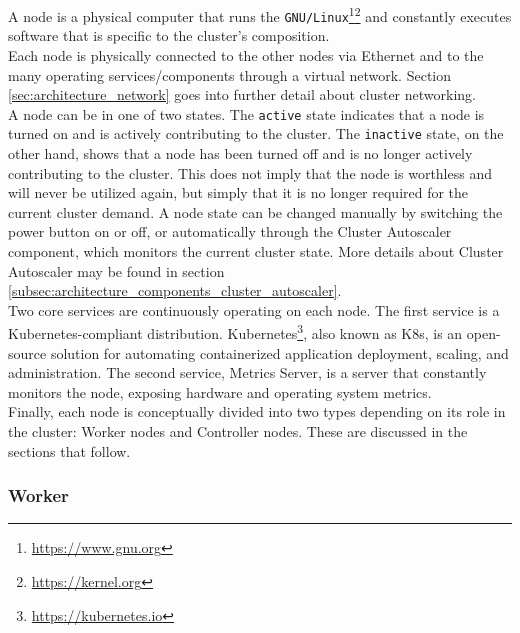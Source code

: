 A node is a physical computer that runs the \texttt{GNU/Linux}\footnote{\url{https://www.gnu.org}}\footnote{\url{https://kernel.org}}
and constantly executes software that is specific to the cluster's composition.
\\ %
Each node is physically connected to the other nodes via Ethernet and to the many
operating services/components through a virtual network. Section
\ref{sec:architecture_network} goes into further detail about cluster networking.
\\ %
A node can be in one of two states. The \texttt{active} state indicates that a
node is turned on and is actively contributing to the cluster. The \texttt{inactive}
state, on the other hand, shows that a node has been turned off and is no longer
actively contributing to the cluster. This does not imply that the node is worthless
and will never be utilized again, but simply that it is no longer required for
the current cluster demand. A node state can be changed manually by switching the
power button on or off, or automatically through the Cluster Autoscaler
component, which monitors the current cluster state. More details about Cluster
Autoscaler may be found in section
\ref{subsec:architecture_components_cluster_autoscaler}. \\ %
Two core services are continuously operating on each node. The first service is a
Kubernetes-compliant distribution. Kubernetes\footnote{\url{https://kubernetes.io}},
also known as K8s, is an open-source solution for automating containerized
application deployment, scaling, and administration. The second service, Metrics
Server, is a server that constantly monitors the node, exposing hardware and
operating system metrics. \\ %
Finally, each node is conceptually divided into two types depending on its role in
the cluster: Worker nodes and Controller nodes. These are discussed in the sections
that follow.

\subsubsection{Worker}
\label{subsubsec:architecture_components_node_worker}

